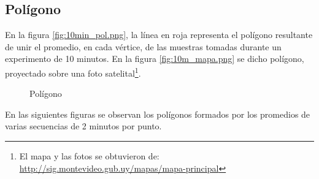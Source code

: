 \documentclass[main]{subfiles}
\begin{document}

\subsection{Polígono}
\label{sec:gps2-poligono}

En la figura \ref{fig:10min_pol.png}, la línea en roja representa el polígono resultante de unir el promedio, en cada vértice, de las muestras tomadas durante un experimento de 10 minutos. En la figura \ref{fig:10m_mapa.png} se dicho polígono, proyectado sobre una foto satelital\footnote{El mapa y las fotos se obtuvieron de:\\ \url{http://sig.montevideo.gub.uy/mapas/mapa-principal}}.

\begin{figure}[h!]
\vspace{-10pt}
  \centering
\vspace{-10pt}
\caption{Polígono}
\vspace{-10pt}
\end{figure}

En las siguientes figuras se observan los polígonos formados por los promedios de varias secuencias de 2 minutos por punto. 
\end{document}
